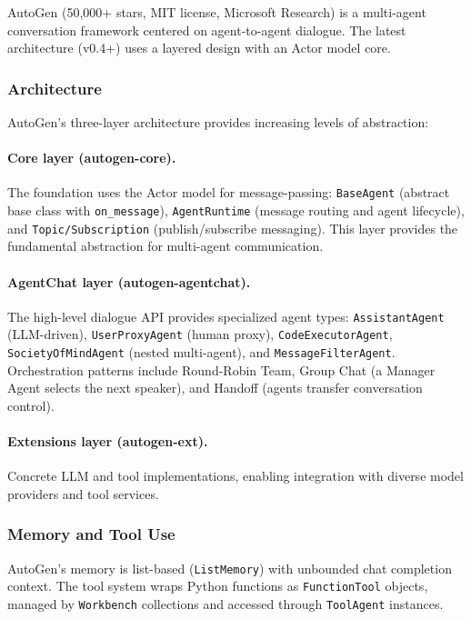 AutoGen (50,000+ stars, MIT license, Microsoft Research) is a multi-agent conversation framework centered on agent-to-agent dialogue. The latest architecture (v0.4+) uses a layered design with an Actor model core.

\subsubsection{Architecture}

AutoGen's three-layer architecture provides increasing levels of abstraction:

\paragraph{Core layer (autogen-core).}
The foundation uses the Actor model for message-passing: \texttt{BaseAgent} (abstract base class with \texttt{on\_message}), \texttt{AgentRuntime} (message routing and agent lifecycle), and \texttt{Topic/Subscription} (publish/subscribe messaging). This layer provides the fundamental abstraction for multi-agent communication.

\paragraph{AgentChat layer (autogen-agentchat).}
The high-level dialogue API provides specialized agent types: \texttt{AssistantAgent} (LLM-driven), \texttt{UserProxyAgent} (human proxy), \texttt{CodeExecutorAgent}, \texttt{SocietyOfMindAgent} (nested multi-agent), and \texttt{MessageFilterAgent}. Orchestration patterns include Round-Robin Team, Group Chat (a Manager Agent selects the next speaker), and Handoff (agents transfer conversation control).

\paragraph{Extensions layer (autogen-ext).}
Concrete LLM and tool implementations, enabling integration with diverse model providers and tool services.

\subsubsection{Memory and Tool Use}

AutoGen's memory is list-based (\texttt{ListMemory}) with unbounded chat completion context. The tool system wraps Python functions as \texttt{FunctionTool} objects, managed by \texttt{Workbench} collections and accessed through \texttt{ToolAgent} instances.

